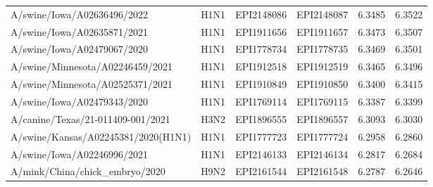 \begin{tabular}{L{1.95in}|L{.25in}|L{.60in}|L{.6in}|C{1in}|C{1in}}
 A/swine/Iowa/A02636496/2022 &H1N1&EPI2148086&EPI2148087&6.3485&6.3522\\
 A/swine/Iowa/A02635871/2021 &H1N1&EPI1911656&EPI1911657&6.3473&6.3507\\
 A/swine/Iowa/A02479067/2020 &H1N1&EPI1778734&EPI1778735&6.3469&6.3501\\
 A/swine/Minnesota/A02246459/2021 &H1N1&EPI1912518&EPI1912519&6.3465&6.3496\\
 A/swine/Minnesota/A02525371/2021 &H1N1&EPI1910849&EPI1910850&6.3400&6.3415\\
 A/swine/Iowa/A02479343/2020 &H1N1&EPI1769114&EPI1769115&6.3387&6.3399\\
 A/canine/Texas/21-011409-001/2021 &H3N2&EPI1896555&EPI1896557&6.3093&6.3030\\
 A/swine/Kansas/A02245381/2020(H1N1) &H1N1&EPI1777723&EPI1777724&6.2958&6.2860\\
 A/swine/Iowa/A02246996/2021 &H1N1&EPI2146133&EPI2146134&6.2817&6.2684\\
 A/mink/China/chick\_embryo/2020 &H9N2&EPI2161544&EPI2161548&6.2787&6.2646\\
\hline\end{tabular}
